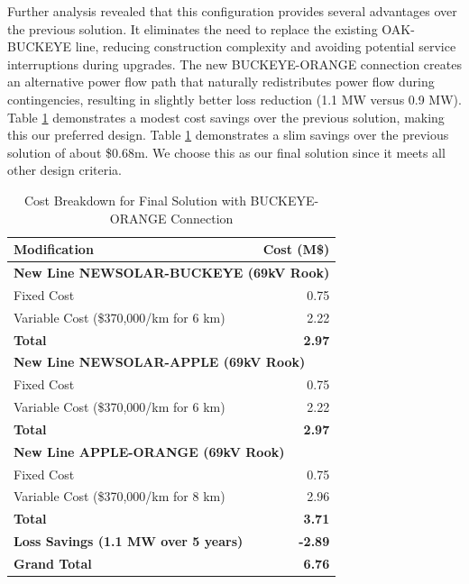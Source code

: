 \documentclass[conference]{IEEEtran}
\begin{document}
Further analysis revealed that this configuration provides several advantages over the previous solution. It eliminates the need to replace the existing OAK-BUCKEYE line, reducing construction complexity and avoiding potential service interruptions during upgrades. The new BUCKEYE-ORANGE connection creates an alternative power flow path that naturally redistributes power flow during contingencies, resulting in slightly better loss reduction (1.1 MW versus 0.9 MW). Table \ref{tab:cost_breakdown_final} demonstrates a modest cost savings over the previous solution, making this our preferred design. Table \ref{tab:cost_breakdown_final} demonstrates a slim savings over the previous solution of about \$0.68m. We choose this as our final solution since it meets all other design criteria. 
\begin{table}[h!]
	\centering
	\begin{tabular}{|l|r|}
		\hline
		\textbf{Modification} & \textbf{Cost (M\$)} \\ \hline
		\multicolumn{2}{|l|}{\textbf{New Line NEWSOLAR-BUCKEYE (69kV Rook)}} \\ 
		\hspace{1em} Fixed Cost & 0.75 \\ 
		\hspace{1em} Variable Cost (\$370,000/km for 6 km) & 2.22 \\ 
		\hspace{1em} \textbf{Total} & \textbf{2.97} \\ \hline
		\multicolumn{2}{|l|}{\textbf{New Line NEWSOLAR-APPLE (69kV Rook)}} \\ 
		\hspace{1em} Fixed Cost & 0.75 \\ 
		\hspace{1em} Variable Cost (\$370,000/km for 6 km) & 2.22 \\ 
		\hspace{1em} \textbf{Total} & \textbf{2.97} \\ \hline
		\multicolumn{2}{|l|}{\textbf{New Line APPLE-ORANGE (69kV Rook)}} \\ 
		\hspace{1em} Fixed Cost & 0.75 \\ 
		\hspace{1em} Variable Cost (\$370,000/km for 8 km) & 2.96 \\ 
		\hspace{1em} \textbf{Total} & \textbf{3.71} \\ \hline
		\textbf{Loss Savings (1.1 MW over 5 years)} & \textbf{-2.89} \\ \hline
		\textbf{Grand Total} & \textbf{6.76} \\ \hline
	\end{tabular}
	\vspace{0.5em}
	\caption{Cost Breakdown for Final Solution with BUCKEYE-ORANGE Connection}
	\label{tab:cost_breakdown_final}
\end{table}
\end{document}

